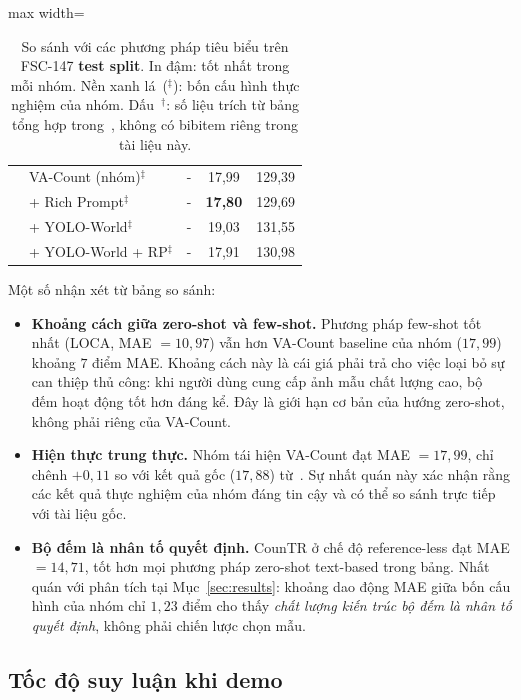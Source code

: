 \documentclass[a4paper,12pt]{report}
\numberwithin{figure}{chapter}
\numberwithin{table}{chapter}
\begin{document}
\begin{table}[H]
\begin{adjustbox}{max width=\textwidth}
\begin{tabular}{|l|l|l|c|c|}
\rowcolor[HTML]{E8F5E9}
                   & VA-Count (nhóm)$^\ddagger$         & {-}    & 17{,}99          & 129{,}39 \\
\rowcolor[HTML]{E8F5E9}
                   & \quad + Rich Prompt$^\ddagger$     & {-}    & \textbf{17{,}80} & 129{,}69 \\
\rowcolor[HTML]{E8F5E9}
                   & \quad + YOLO-World$^\ddagger$      & {-}    & 19{,}03          & 131{,}55 \\
\rowcolor[HTML]{E8F5E9}
                   & \quad + YOLO-World + RP$^\ddagger$ & {-}    & 17{,}91          & 130{,}98 \\
\hline
\end{tabular}
\end{adjustbox}
\caption{So sánh với các phương pháp tiêu biểu trên FSC-147 \textbf{test split}. In đậm: tốt nhất trong mỗi nhóm. Nền xanh lá~($^\ddagger$): bốn cấu hình thực nghiệm của nhóm. Dấu~$^\dagger$: số liệu trích từ bảng tổng hợp trong~\cite{richprompts}, không có bibitem riêng trong tài liệu này.}
\label{tab:sota}
\end{table}

Một số nhận xét từ bảng so sánh:

\begin{itemize}
    \item \textbf{Khoảng cách giữa zero-shot và few-shot.} Phương pháp few-shot tốt nhất (LOCA, MAE $= 10{,}97$) vẫn hơn VA-Count baseline của nhóm ($17{,}99$) khoảng $7$ điểm MAE. Khoảng cách này là cái giá phải trả cho việc loại bỏ sự can thiệp thủ công: khi người dùng cung cấp ảnh mẫu chất lượng cao, bộ đếm hoạt động tốt hơn đáng kể. Đây là giới hạn cơ bản của hướng zero-shot, không phải riêng của VA-Count.
    \item \textbf{Hiện thực trung thực.} Nhóm tái hiện VA-Count đạt MAE $= 17{,}99$, chỉ chênh $+0{,}11$ so với kết quả gốc ($17{,}88$) từ~\cite{vacount}. Sự nhất quán này xác nhận rằng các kết quả thực nghiệm của nhóm đáng tin cậy và có thể so sánh trực tiếp với tài liệu gốc.
    \item \textbf{Bộ đếm là nhân tố quyết định.} CounTR ở chế độ reference-less đạt MAE $= 14{,}71$, tốt hơn mọi phương pháp zero-shot text-based trong bảng. Nhất quán với phân tích tại Mục~\ref{sec:results}: khoảng dao động MAE giữa bốn cấu hình của nhóm chỉ $1{,}23$ điểm cho thấy \emph{chất lượng kiến trúc bộ đếm là nhân tố quyết định}, không phải chiến lược chọn mẫu.
\end{itemize}

\subsection{Tốc độ suy luận khi demo}
\end{document}
